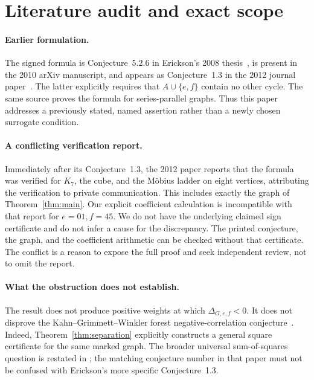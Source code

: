 \documentclass[11pt,a4paper]{article}
\begin{document}
\section{Literature audit and exact scope}

\paragraph{Earlier formulation.}
The signed formula is Conjecture~5.2.6 in Erickson's 2008
thesis~\cite{Erickson2008}, is present in the 2010 arXiv manuscript,
and appears as Conjecture~1.3 in the 2012 journal
paper~\cite{Erickson2012}. The latter explicitly requires that
$A\cup\{e,f\}$ contain no other cycle. The same source proves
the formula for series-parallel graphs. Thus this paper addresses
a previously stated, named assertion rather than a newly chosen
surrogate condition.

\paragraph{A conflicting verification report.}
Immediately after its Conjecture~1.3, the 2012 paper reports that
the formula was verified for $K_7$, the cube, and the M\"obius
ladder on eight vertices, attributing the verification to private
communication. This includes exactly the graph of
Theorem~\ref{thm:main}. Our explicit coefficient calculation is
incompatible with that report for $e=01,f=45$. We do not have
the underlying claimed sign certificate and do not infer a cause
for the discrepancy. The printed conjecture, the graph, and the
coefficient arithmetic can be checked without that certificate.
The conflict is a reason to expose the full proof and seek
independent review, not to omit the report.

\paragraph{What the obstruction does not establish.}
The result does not produce positive weights at which
$\Delta_{G,e,f}<0$. It does not disprove the Kahn--Grimmett--Winkler
forest negative-correlation conjecture~\cite{GrimmettWinkler2004}.
Indeed, Theorem~\ref{thm:separation} explicitly constructs a general
square certificate for the same marked graph. The broader universal
sum-of-squares question is restated in
\cite[Conjecture~1.3]{CiceksizRavichandran2026}; the matching
conjecture number in that paper must not be confused with
Erickson's more specific Conjecture~1.3.
\end{document}
